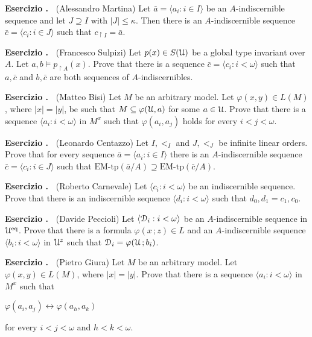 \documentclass[10pt]{article}
\def\phi{\varphi}
\def\D{\EuScript D}
\def\U{\EuScript U}
\def\<{\langle}
\def\>{\rangle}
\def\iff{\leftrightarrow}
\def\eq{{\rm eq}}
\newcounter{ex}
\newenvironment{exercise}{\bigskip\addtocounter{ex}{1}\textbf{Esercizio \theex.\ }}{}
\begin{document}
\begin{exercise}
  (Alessandro Martina)
  Let $\bar a=\<a_i:i\in I\>$ be an $A$-indiscernible sequence and let $J\supseteq I$ with $|J|\le \kappa$.
  Then there is an $A$-indiscernible sequence $\bar c=\<c_i:i\in J\>$ such that $c_{\restriction I}=\bar a$.
\end{exercise}

\begin{exercise} 
  (Francesco Sulpizi)
  Let  $p(x)\in S(\U)$ be a global type invariant over $A$.
  Let $a,b\models p_{\restriction A}(x)$.
  Prove that there is a sequence $\bar c=\<c_i:i<\omega\>$ such that $a,\bar c$ and $b,\bar c$ are both sequences of $A$-indiscernibles.
\end{exercise}

\begin{exercise}
  (Matteo Bisi)
  Let $M$ be an arbitrary model.
  Let $\phi(x,y)\in L(M)$, where $|x|=|y|$, be such that $M\subseteq\phi(\U,a)$ for some $a\in\U$.
  Prove that there is a sequence $\langle a_i:i<\omega\rangle$ in $M^{x}$ such that $\phi(a_i,a_j)$ holds for every $i<j<\omega$.
\end{exercise}

\begin{exercise}
  (Leonardo Centazzo)
  Let $I,<_I$ and $J,<_J$ be infinite linear orders.
  Prove that for every sequence $\bar a=\<a_i:i\in I\>$ there is an $A$-indiscernible sequence $\bar c=\<c_i:i\in J\>$ such that $\mbox{EM-tp}(\bar a/A)\supseteq\mbox{EM-tp}(\bar c/A)$.
\end{exercise}

\begin{exercise}
  (Roberto Carnevale)
  Let $\<c_i:i<\omega\>$ be an indiscernible sequence.
  Prove that there is an indiscernible sequence $\<d_i:i<\omega\>$ such that $d_0,d_1 = c_1,c_0$.
\end{exercise}

\begin{exercise}
  (Davide Peccioli)
  Let $\<\D_i:i<\omega\>$ be an $A$-indiscernible sequence in $\U^\eq$.
  Prove that there is a formula $\phi(x\,;z)\in L$ and an $A$-indiscernible sequence $\<b_i:i<\omega\>$ in $\U^z$ such that $\D_i=\phi(\U\,;b_i)$.
\end{exercise}

\begin{exercise}
  (Pietro Giura)
  Let $M$ be an arbitrary model.
  Let $\phi(x,y)\in L(M)$, where $|x|=|y|$.
  Prove that there is a sequence $\langle a_i:i<\omega\rangle$ in $M^{x}$ such that

  \hfil$\phi(a_i,a_j)\iff\phi(a_h,a_k)$

  for every $i<j<\omega$ and $h<k<\omega$.
\end{exercise}
\end{document}
